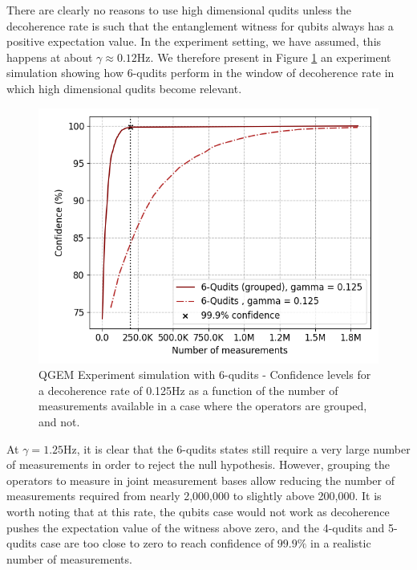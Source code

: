 \documentclass[%
 reprint,
 superscriptaddress,
 amsmath,
 amssymb,
 aps,
 longbibliography
]{revtex4-2}
\begin{document}
\indent There are clearly no reasons to use high dimensional qudits unless the decoherence rate is such that the entanglement witness for qubits always has a positive expectation value. In the experiment setting, we have assumed, this happens at about $\gamma \approx 0.12$Hz. We therefore present in Figure \ref{fig:expsim_qudits_125} an experiment simulation showing how 6-qudits perform in the window of decoherence rate in which high dimensional qudits become relevant.
	\begin{figure}
    		\includegraphics[width=1.\columnwidth]{EW_confidence_6qudits_deco_125.png}\par\medskip
	    \caption{QGEM Experiment simulation with 6-qudits - Confidence levels for a decoherence rate of 0.125Hz as a function of the number of measurements available in a case where the operators are grouped, and not.} \label{fig:expsim_qudits_125}
	\end{figure} 
\indent At $\gamma = 1.25$Hz, it is clear that the 6-qudits states still require a very large number of measurements in order to reject the null hypothesis. However, grouping the operators to measure in joint measurement bases allow reducing the number of measurements required from nearly 2,000,000 to slightly above 200,000. It is worth noting that at this rate, the qubits case would not work as decoherence pushes the expectation value of the witness above zero, and the 4-qudits and 5-qudits case are too close to zero to reach confidence of $99.9\%$ in a realistic number of measurements. \\

\end{document}
